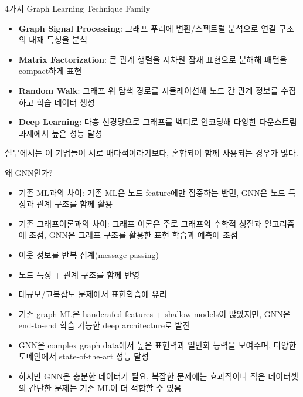 \begin{frame}{4가지 Graph Learning Technique Family}
\small
\begin{itemize}
  \item \textbf{Graph Signal Processing}: 그래프 푸리에 변환/스펙트럴 분석으로 연결 구조의 내재 특성을 분석
  \item \textbf{Matrix Factorization}: 큰 관계 행렬을 저차원 잠재 표현으로 분해해 패턴을 compact하게 표현
  \item \textbf{Random Walk}: 그래프 위 탐색 경로를 시뮬레이션해 노드 간 관계 정보를 수집하고 학습 데이터 생성
  \item \textbf{Deep Learning}: 다층 신경망으로 그래프를 벡터로 인코딩해 다양한 다운스트림 과제에서 높은 성능 달성
\end{itemize}
\vspace{0.3em}
\footnotesize
실무에서는 이 기법들이 서로 배타적이라기보다, 혼합되어 함께 사용되는 경우가 많다.
\end{frame}

\begin{frame}{왜 GNN인가?}
\begin{itemize}
  \item 기존 ML과의 차이: 기존 ML은 노드 feature에만 집중하는 반면, GNN은 노드 특징과 관계 구조를 함께 활용
  \item 기존 그래프이론과의 차이: 그래프 이론은 주로 그래프의 수학적 성질과 알고리즘에 초점, GNN은 그래프 구조를 활용한 표현 학습과 예측에 초점
  \item 이웃 정보를 반복 집계(message passing)
  \item 노드 특징 + 관계 구조를 함께 반영
  \item 대규모/고복잡도 문제에서 표현학습에 유리
  \item 기존 graph ML은 handcrafed features + shallow models이 많았지만, GNN은 end-to-end 학습 가능한 deep architecture로 발전
  \item GNN은 complex graph data에서 높은 표현력과 일반화 능력을 보여주며, 다양한 도메인에서 state-of-the-art 성능 달성
  \item 하지만 GNN은 충분한 데이터가 필요, 복잡한 문제에는 효과적이나 작은 데이터셋의 간단한 문제는 기존 ML이 더 적합할 수 있음
\end{itemize}
\end{frame}

